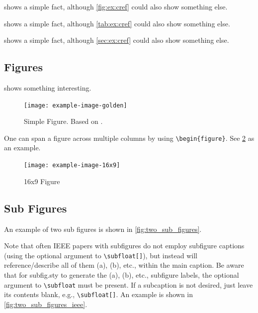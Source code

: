\documentclass[conference,a4paper,english]{IEEEtran}[2015/08/26]
\begin{document}
\begin{ltgexample}
 shows a simple fact, although \cref{fig:ex:cref} could also show something else.

 shows a simple fact, although \cref{tab:ex:cref} could also show something else.

 shows a simple fact, although \cref{sec:ex:cref} could also show something else.
\end{ltgexample}

\subsection{Figures}

\begin{ltgexample}
 shows something interesting.

\begin{figure}
  \centering
  \texttt{[image: example-image-golden]}
  \caption[Simple Figure]{Simple Figure. Based on \citet{mwe}.}
  \label{fig:label}
\end{figure}
\end{ltgexample}

One can span a figure across multiple columns by using \verb+\begin{figure}+.
See \cref{fig:16x9} as an example.

\begin{ltgexample}
\begin{figure}
  \centering
  \texttt{[image: example-image-16x9]}
  \caption{16x9 Figure}
  \label{fig:16x9}
\end{figure}
\end{ltgexample}


\subsection{Sub Figures}

An example of two sub figures is shown in \cref{fig:two_sub_figures}.



Note that often IEEE papers with subfigures do not employ subfigure
captions (using the optional argument to \verb+\subfloat[]+), but instead will
reference/describe all of them (a), (b), etc., within the main caption.
Be aware that for subfig.sty to generate the (a), (b), etc., subfigure
labels, the optional argument to \verb+\subfloat+ must be present. If a
subcaption is not desired, just leave its contents blank,
e.g., \verb+\subfloat[]+.
An example is shown in \cref{fig:two_sub_figures_ieee}.
\end{document}
